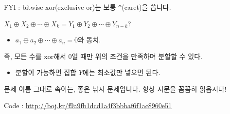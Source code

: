 \documentclass[hyperref={unicode}]{beamer}
\begin{document}
 
    \begin{frame}[fragile]
         FYI : bitwise xor(exclusive or)는 보통 \verb|^|(caret)을 씁니다.
    
         $ X_1 \oplus X_2 \oplus \cdots \oplus X_k = Y_1 \oplus Y_2 \oplus \cdots \oplus Y_{n-k}$?
        \begin{itemize}
        \item<3-> $ a_1 \oplus a_2 \oplus \cdots \oplus a_n = 0 $와 동치.
        \end{itemize}
         즉, 모든 수를 xor해서 0일 때만 위의 조건을 만족하며 분할할 수 있다.
        \begin{itemize}
        \item<5-> 분할이 가능하면 집합 $ Y $에는 최소값만 넣으면 된다.
        \end{itemize}
         문제 이름 그대로 속이는, 좋은 낚시 문제입니다. 항상 지문을 꼼꼼히 읽읍시다!
    \end{frame}
    
    \begin{frame}
        Code : \url{http://boj.kr/f9a9fb1dcd1a4f3bbbaf6f1ac8960e51}
    \end{frame}
\end{document}
